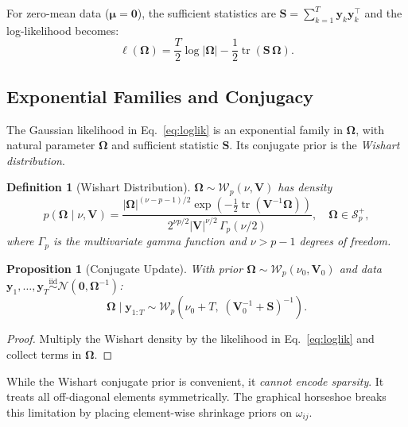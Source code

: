 \documentclass[11pt,a4paper]{article}
\newtheorem{proposition}[theorem]{Proposition}
\newtheorem{definition}[theorem]{Definition}
\newcommand{\tr}{\operatorname{tr}}
\newcommand{\Normal}{\mathcal{N}}
\newcommand{\Wishartd}{\mathcal{W}}
\newcommand{\Spp}{\mathcal{S}^{+}_p}
\newcommand{\bOmega}{\bm{\Omega}}
\begin{document}
For zero-mean data ($\bm{\mu}=\bm{0}$), the sufficient statistics are $\bm{S} = \sum_{k=1}^T \bm{y}_k\bm{y}_k^\top$ and the log-likelihood becomes:
\begin{equation}\label{eq:loglik}
  \ell(\bOmega) = \frac{T}{2}\log|\bOmega| - \frac{1}{2}\tr(\bm{S}\,\bOmega).
\end{equation}

\subsection{Exponential Families and Conjugacy}

The Gaussian likelihood in Eq.~\eqref{eq:loglik} is an exponential family in $\bOmega$, with natural parameter $\bOmega$ and sufficient statistic $\bm{S}$. Its conjugate prior is the \emph{Wishart distribution}.

\begin{definition}[Wishart Distribution]
$\bOmega \sim \Wishartd_p(\nu, \bm{V})$ has density
\begin{equation}
  p(\bOmega \mid \nu, \bm{V}) = \frac{|\bOmega|^{(\nu-p-1)/2}\exp(-\frac{1}{2}\tr(\bm{V}^{-1}\bOmega))}{2^{\nu p/2}|\bm{V}|^{\nu/2}\,\Gamma_p(\nu/2)},
  \quad \bOmega \in \Spp,
\end{equation}
where $\Gamma_p$ is the multivariate gamma function and $\nu > p-1$ degrees of freedom.
\end{definition}

\begin{proposition}[Conjugate Update]
With prior $\bOmega \sim \Wishartd_p(\nu_0, \bm{V}_0)$ and data $\bm{y}_1,\ldots,\bm{y}_T \stackrel{\text{iid}}{\sim}\Normal(\bm{0},\bOmega^{-1})$:
\begin{equation}
  \bOmega \mid \bm{y}_{1:T} \sim \Wishartd_p\!\left(\nu_0 + T,\; (\bm{V}_0^{-1} + \bm{S})^{-1}\right).
\end{equation}
\end{proposition}
\begin{proof}
Multiply the Wishart density by the likelihood in Eq.~\eqref{eq:loglik} and collect terms in $\bOmega$.
\end{proof}

\begin{keyinsight}
While the Wishart conjugate prior is convenient, it \emph{cannot encode sparsity}. It treats all off-diagonal elements symmetrically. The graphical horseshoe breaks this limitation by placing element-wise shrinkage priors on $\omega_{ij}$.
\end{keyinsight}
\end{document}
